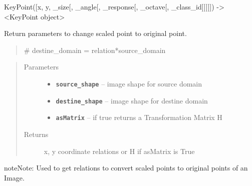 \documentclass[letterpaper,10pt,english]{sphinxmanual}
\begin{document}

\begin{fulllineitems}
\label{RRtoolbox.lib.arrayops:RRtoolbox.lib.arrayops.convert.dict2keyPoint}
KeyPoint({[}x, y, \_size{[}, \_angle{[}, \_response{[}, \_octave{[}, \_class\_id{]}{]}{]}{]}{]}) -\textgreater{} \textless{}KeyPoint object\textgreater{}

\end{fulllineitems}


\begin{fulllineitems}
\label{RRtoolbox.lib.arrayops:RRtoolbox.lib.arrayops.convert.getSOpointRelation}
Return parameters to change scaled point to original point.
\begin{quote}

\# destine\_domain = relation*source\_domain
\end{quote}
\begin{quote}\begin{description}
\item[{Parameters}] \leavevmode\begin{itemize}
\item {} 
\textbf{\texttt{source\_shape}} -- image shape for source domain

\item {} 
\textbf{\texttt{destine\_shape}} -- image shape for destine domain

\item {} 
\textbf{\texttt{asMatrix}} -- if true returns a Transformation Matrix H

\end{itemize}

\item[{Returns}] \leavevmode
x, y coordinate relations or H if asMatrix is True

\end{description}\end{quote}

\begin{notice}{note}{Note:}
Used to get relations to convert scaled points to original points of an Image.
\end{notice}

\end{fulllineitems}
\end{document}
